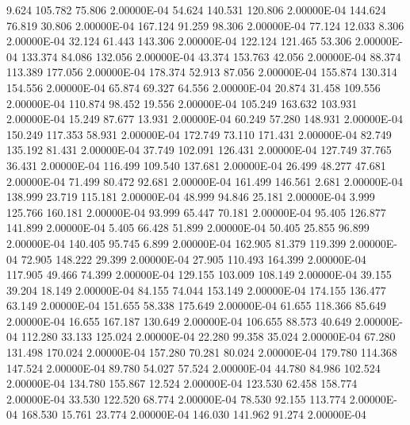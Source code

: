      9.624   105.782    75.806  2.00000E-04
    54.624   140.531   120.806  2.00000E-04
   144.624    76.819    30.806  2.00000E-04
   167.124    91.259    98.306  2.00000E-04
    77.124    12.033     8.306  2.00000E-04
    32.124    61.443   143.306  2.00000E-04
   122.124   121.465    53.306  2.00000E-04
   133.374    84.086   132.056  2.00000E-04
    43.374   153.763    42.056  2.00000E-04
    88.374   113.389   177.056  2.00000E-04
   178.374    52.913    87.056  2.00000E-04
   155.874   130.314   154.556  2.00000E-04
    65.874    69.327    64.556  2.00000E-04
    20.874    31.458   109.556  2.00000E-04
   110.874    98.452    19.556  2.00000E-04
   105.249   163.632   103.931  2.00000E-04
    15.249    87.677    13.931  2.00000E-04
    60.249    57.280   148.931  2.00000E-04
   150.249   117.353    58.931  2.00000E-04
   172.749    73.110   171.431  2.00000E-04
    82.749   135.192    81.431  2.00000E-04
    37.749   102.091   126.431  2.00000E-04
   127.749    37.765    36.431  2.00000E-04
   116.499   109.540   137.681  2.00000E-04
    26.499    48.277    47.681  2.00000E-04
    71.499    80.472    92.681  2.00000E-04
   161.499   146.561     2.681  2.00000E-04
   138.999    23.719   115.181  2.00000E-04
    48.999    94.846    25.181  2.00000E-04
     3.999   125.766   160.181  2.00000E-04
    93.999    65.447    70.181  2.00000E-04
    95.405   126.877   141.899  2.00000E-04
     5.405    66.428    51.899  2.00000E-04
    50.405    25.855    96.899  2.00000E-04
   140.405    95.745     6.899  2.00000E-04
   162.905    81.379   119.399  2.00000E-04
    72.905   148.222    29.399  2.00000E-04
    27.905   110.493   164.399  2.00000E-04
   117.905    49.466    74.399  2.00000E-04
   129.155   103.009   108.149  2.00000E-04
    39.155    39.204    18.149  2.00000E-04
    84.155    74.044   153.149  2.00000E-04
   174.155   136.477    63.149  2.00000E-04
   151.655    58.338   175.649  2.00000E-04
    61.655   118.366    85.649  2.00000E-04
    16.655   167.187   130.649  2.00000E-04
   106.655    88.573    40.649  2.00000E-04
   112.280    33.133   125.024  2.00000E-04
    22.280    99.358    35.024  2.00000E-04
    67.280   131.498   170.024  2.00000E-04
   157.280    70.281    80.024  2.00000E-04
   179.780   114.368   147.524  2.00000E-04
    89.780    54.027    57.524  2.00000E-04
    44.780    84.986   102.524  2.00000E-04
   134.780   155.867    12.524  2.00000E-04
   123.530    62.458   158.774  2.00000E-04
    33.530   122.520    68.774  2.00000E-04
    78.530    92.155   113.774  2.00000E-04
   168.530    15.761    23.774  2.00000E-04
   146.030   141.962    91.274  2.00000E-04
